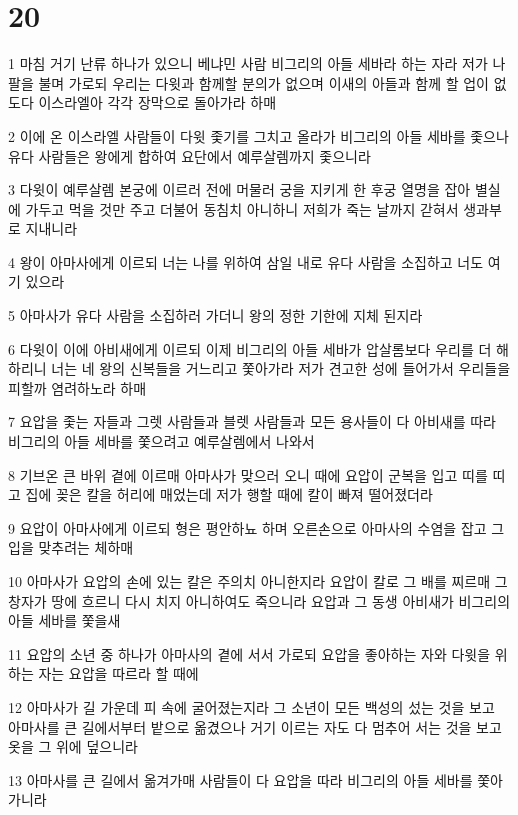 \chapter{20}

\par 1 마침 거기 난류 하나가 있으니 베냐민 사람 비그리의 아들 세바라 하는 자라 저가 나팔을 불며 가로되 우리는 다윗과 함께할 분의가 없으며 이새의 아들과 함께 할 업이 없도다 이스라엘아 각각 장막으로 돌아가라 하매
\par 2 이에 온 이스라엘 사람들이 다윗 좇기를 그치고 올라가 비그리의 아들 세바를 좇으나 유다 사람들은 왕에게 합하여 요단에서 예루살렘까지 좇으니라
\par 3 다윗이 예루살렘 본궁에 이르러 전에 머물러 궁을 지키게 한 후궁 열명을 잡아 별실에 가두고 먹을 것만 주고 더불어 동침치 아니하니 저희가 죽는 날까지 갇혀서 생과부로 지내니라
\par 4 왕이 아마사에게 이르되 너는 나를 위하여 삼일 내로 유다 사람을 소집하고 너도 여기 있으라
\par 5 아마사가 유다 사람을 소집하러 가더니 왕의 정한 기한에 지체 된지라
\par 6 다윗이 이에 아비새에게 이르되 이제 비그리의 아들 세바가 압살롬보다 우리를 더 해하리니 너는 네 왕의 신복들을 거느리고 쫓아가라 저가 견고한 성에 들어가서 우리들을 피할까 염려하노라 하매
\par 7 요압을 좇는 자들과 그렛 사람들과 블렛 사람들과 모든 용사들이 다 아비새를 따라 비그리의 아들 세바를 쫓으려고 예루살렘에서 나와서
\par 8 기브온 큰 바위 곁에 이르매 아마사가 맞으러 오니 때에 요압이 군복을 입고 띠를 띠고 집에 꽂은 칼을 허리에 매었는데 저가 행할 때에 칼이 빠져 떨어졌더라
\par 9 요압이 아마사에게 이르되 형은 평안하뇨 하며 오른손으로 아마사의 수염을 잡고 그 입을 맞추려는 체하매
\par 10 아마사가 요압의 손에 있는 칼은 주의치 아니한지라 요압이 칼로 그 배를 찌르매 그 창자가 땅에 흐르니 다시 치지 아니하여도 죽으니라 요압과 그 동생 아비새가 비그리의 아들 세바를 쫓을새
\par 11 요압의 소년 중 하나가 아마사의 곁에 서서 가로되 요압을 좋아하는 자와 다윗을 위하는 자는 요압을 따르라 할 때에
\par 12 아마사가 길 가운데 피 속에 굴어졌는지라 그 소년이 모든 백성의 섰는 것을 보고 아마사를 큰 길에서부터 밭으로 옮겼으나 거기 이르는 자도 다 멈추어 서는 것을 보고 옷을 그 위에 덮으니라
\par 13 아마사를 큰 길에서 옮겨가매 사람들이 다 요압을 따라 비그리의 아들 세바를 쫓아가니라
